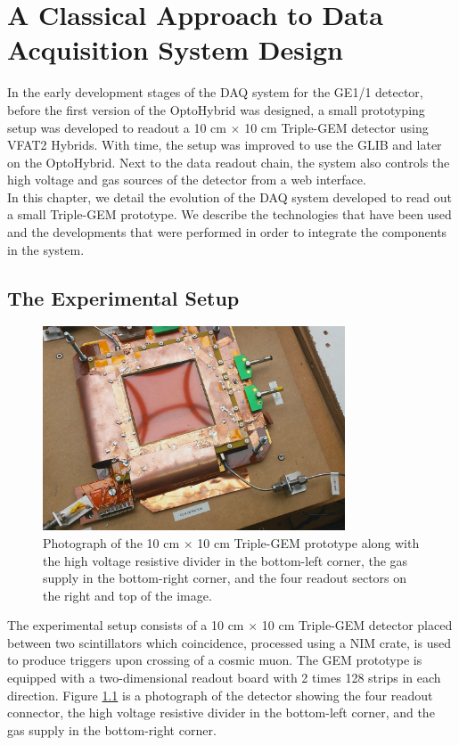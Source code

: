 \chapter{A Classical Approach to Data Acquisition System Design}
\label{chap:III-1-arch}

  In the early development stages of the DAQ system for the GE1/1 detector, before the first version of the OptoHybrid was designed, a small prototyping setup was developed to readout a 10 cm $ \times $ 10 cm Triple-GEM detector using VFAT2 Hybrids. With time, the setup was improved to use the GLIB and later on the OptoHybrid. Next to the data readout chain, the system also controls the high voltage and gas sources of the detector from a web interface. \\

  In this chapter, we detail the evolution of the DAQ system developed to read out a small Triple-GEM prototype. We describe the technologies that have been used and the developments that were performed in order to integrate the components in the system.

  \section{The Experimental Setup}

    \begin{figure}[b!]
      \centering
      \includegraphics[width=0.8\textwidth]{img/III-1-arch/gem.png}
      \caption{Photograph of the 10 cm $ \times $ 10 cm Triple-GEM prototype along with the high voltage resistive divider in the bottom-left corner, the gas supply in the bottom-right corner, and the four readout sectors on the right and top of the image.}
      \label{fig:III-1-gem}
    \end{figure}

    The experimental setup consists of a 10 cm $ \times $ 10 cm Triple-GEM detector placed between two scintillators which coincidence, processed using a NIM crate, is used to produce triggers upon crossing of a cosmic muon. The GEM prototype is equipped with a two-dimensional readout board with 2 times 128 strips in each direction. Figure \ref{fig:III-1-gem} is a photograph of the detector showing the four readout connector, the high voltage resistive divider in the bottom-left corner, and the gas supply in the bottom-right corner. \\


